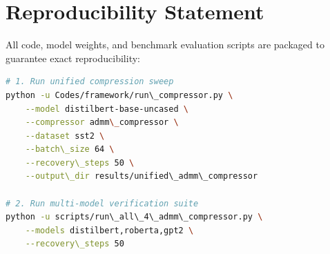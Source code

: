 \section{Reproducibility Statement}
All code, model weights, and benchmark evaluation scripts are packaged to guarantee exact reproducibility:
\begin{lstlisting}[language=bash]
# 1. Run unified compression sweep
python -u Codes/framework/run\_compressor.py \
    --model distilbert-base-uncased \
    --compressor admm\_compressor \
    --dataset sst2 \
    --batch\_size 64 \
    --recovery\_steps 50 \
    --output\_dir results/unified\_admm\_compressor

# 2. Run multi-model verification suite
python -u scripts/run\_all\_4\_admm\_compressor.py \
    --models distilbert,roberta,gpt2 \
    --recovery\_steps 50
\end{lstlisting}
